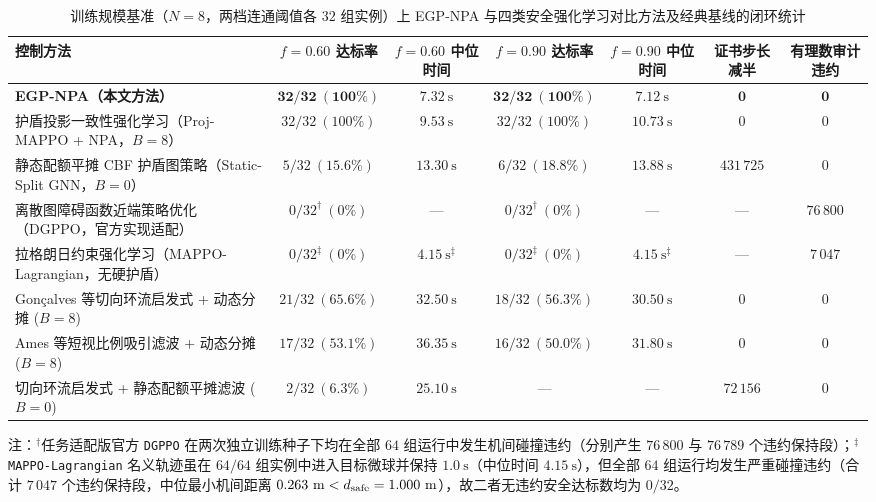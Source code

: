 \begin{table}[t]
 \centering\footnotesize
 \caption{训练规模基准（$N=8$，两档连通阈值各 $32$ 组实例）上 EGP-NPA 与四类安全强化学习对比方法及经典基线的闭环统计}\label{tab:e1}
 \begin{tabularx}{\textwidth}{@{}Xcccccc@{}}
 \toprule
 控制方法 & $f=0.60$ 达标率 & $f=0.60$ 中位时间 & $f=0.90$ 达标率 & $f=0.90$ 中位时间 & 证书步长减半 & 有理数审计违约\\
 \midrule
 \textbf{EGP-NPA（本文方法）} & $\mathbf{32/32\ (100\%)}$ & $\mathbf{7.32\ \mathrm s}$ & $\mathbf{32/32\ (100\%)}$ & $\mathbf{7.12\ \mathrm s}$ & $\mathbf{0}$ & $\mathbf{0}$\\
 护盾投影一致性强化学习\cite{wabersich2021,liu2026saferl}（Proj-MAPPO + NPA，$B=8$） & $32/32\ (100\%)$ & $9.53\ \mathrm s$ & $32/32\ (100\%)$ & $10.73\ \mathrm s$ & $0$ & $0$\\
 静态配额平摊 CBF 护盾图策略\cite{ames2017cbf,zhang2025gcbf}（Static-Split GNN，$B=0$） & $5/32\ (15.6\%)$ & $13.30\ \mathrm s$ & $6/32\ (18.8\%)$ & $13.88\ \mathrm s$ & $431\,725$ & $0$\\
 离散图障碍函数近端策略优化\cite{zhang2025dgppo}（DGPPO，官方实现适配） & $0/32^\dagger\ (0\%)$ & --- & $0/32^\dagger\ (0\%)$ & --- & --- & $76\,800$\\
 拉格朗日约束强化学习\cite{gu2023safe}（MAPPO-Lagrangian，无硬护盾） & $0/32^\ddagger\ (0\%)$ & $4.15\ \mathrm s^\ddagger$ & $0/32^\ddagger\ (0\%)$ & $4.15\ \mathrm s^\ddagger$ & --- & $7\,047$\\
 Gon\c{c}alves 等\cite{goncalves2023circulation}切向环流启发式 + 动态分摊 ($B=8$) & $21/32\ (65.6\%)$ & $32.50\ \mathrm s$ & $18/32\ (56.3\%)$ & $30.50\ \mathrm s$ & $0$ & $0$\\
 Ames 等\cite{ames2017cbf,reis2021}短视比例吸引滤波 + 动态分摊 ($B=8$) & $17/32\ (53.1\%)$ & $36.35\ \mathrm s$ & $16/32\ (50.0\%)$ & $31.80\ \mathrm s$ & $0$ & $0$\\
 切向环流启发式 + 静态配额平摊滤波\cite{ames2017cbf,zhang2025gcbf} ($B=0$) & $2/32\ (6.3\%)$ & $25.10\ \mathrm s$ & --- & --- & $72\,156$ & $0$\\
 \bottomrule
 \end{tabularx}
 \vspace{1.5pt}
 \par\raggedright\scriptsize 注：$^\dagger$任务适配版官方 \texttt{DGPPO} 在两次独立训练种子下均在全部 $64$ 组运行中发生机间碰撞违约（分别产生 $76\,800$ 与 $76\,789$ 个违约保持段）；$^\ddagger$\texttt{MAPPO-Lagrangian} 名义轨迹虽在 $64/64$ 组实例中进入目标微球并保持 $1.0\ \mathrm s$（中位时间 $4.15\ \mathrm s$），但全部 $64$ 组运行均发生严重碰撞违约（合计 $7\,047$ 个违约保持段，中位最小机间距离 $0.263\ \mathrm m < d_{\mathrm{safe}}=1.000\ \mathrm m$），故二者无违约安全达标数均为 $0/32$。
\end{table}

